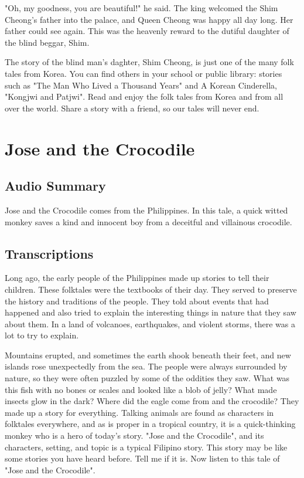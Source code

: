 "Oh, my goodness, you are beautiful!" he said. The king welcomed the Shim Cheong's father into the palace, and Queen Cheong was happy all day long. Her father could see again. This was the heavenly reward to the dutiful daughter of the blind beggar, Shim.

The story of the blind man's daghter, Shim Cheong, is just one of the many folk tales from Korea. You can find others in your school or public library: stories such as "The Man Who Lived a Thousand Years" and A Korean Cinderella, "Kongjwi and Patjwi". Read and enjoy the folk tales from Korea and from all over the world. Share a story with a friend, so our tales will never end.

\section{Jose and the Crocodile}

\subsection{Audio Summary}

Jose and the Crocodile comes from the Philippines.
In this tale, a quick witted monkey saves a kind and innocent boy from a deceitful and villainous crocodile.

\subsection{Transcriptions}

Long ago, the early people of the Philippines made up stories to tell their children. These folktales were the textbooks of their day. They served to preserve the history and traditions of the people. They told about events that had happened and also tried to explain the interesting things in nature that they saw about them. In a land of volcanoes, earthquakes, and violent storms, there was a lot to try to explain.

Mountains erupted, and sometimes the earth shook beneath their feet, and new islands rose unexpectedly from the sea. The people were always surrounded by nature, so they were often puzzled by some of the oddities they saw. What was this fish with no bones or scales and looked like a blob of jelly? What made insects glow in the dark? Where did the eagle come from and the crocodile? They made up a story for everything. Talking animals are found as characters in folktales everywhere, and as is proper in a tropical country, it is a quick-thinking monkey who is a hero of today's story. "Jose and the Crocodile", and its characters, setting, and topic is a typical Filipino story. This story may be like some stories you have heard before. Tell me if it is. Now listen to this tale of "Jose and the Crocodile".


